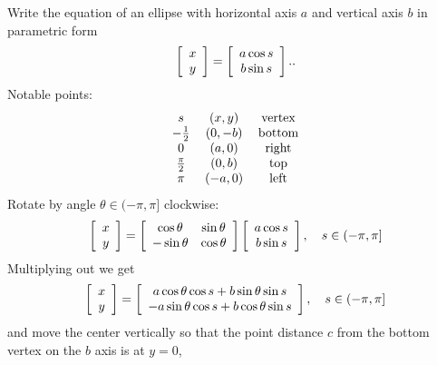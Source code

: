 \documentclass{article}%
\begin{document}
Write the equation of an ellipse with horizontal axis $a$ and vertical axis
$b$ in parametric form%
\[
\left[
\begin{array}
[c]{c}%
x\\
y
\end{array}
\right]  =\left[
\begin{array}
[c]{c}%
a\cos s\\
b\sin s
\end{array}
\right]  ..
\]
Notable points:%
\[%
\begin{tabular}
[c]{ccc}%
$s$ & $\left(  x,y\right)  $ & vertex\\
$-\frac{1}{2}$ & $\left(  0,-b\right)  $ & bottom\\
$0$ & $\left(  a,0\right)  $ & right\\
$\frac{\pi}{2}$ & $\left(  0,b\right)  $ & top\\
$\pi$ & $\left(  -a,0\right)  $ & left
\end{tabular}
\]
Rotate by angle $\theta\in(-\pi,\pi]$ clockwise:%
\[
\left[
\begin{array}
[c]{c}%
x\\
y
\end{array}
\right]  =\left[
\begin{array}
[c]{cc}%
\cos\theta & \sin\theta\\
-\sin\theta & \cos\theta
\end{array}
\right]  \left[
\begin{array}
[c]{c}%
a\cos s\\
b\sin s
\end{array}
\right]  ,\quad s\in(-\pi,\pi]
\]
Multiplying out we get%
\[
\left[
\begin{array}
[c]{c}%
x\\
y
\end{array}
\right]  =\left[
\begin{array}
[c]{c}%
a\cos\theta\cos s+b\sin\theta\sin s\\
-a\sin\theta\cos s+b\cos\theta\sin s
\end{array}
\right]  ,\quad s\in(-\pi,\pi]
\]
and move the center vertically so that the point distance $c$ from the bottom
vertex on the $b$ axis is at $y=0$,%
\end{document}
